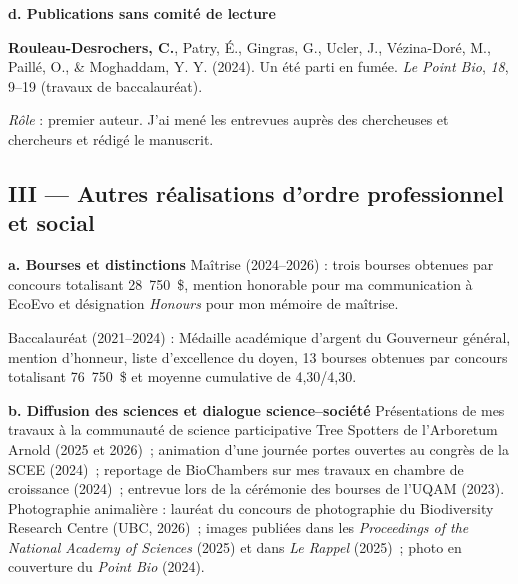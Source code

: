 \documentclass[12pt]{article}
\begin{document}

\textbf{d. Publications sans comité de lecture} 

\textbf{Rouleau-Desrochers, C.}, Patry, É., Gingras, G., Ucler, J., Vézina-Doré, M., Paillé, O., \& Moghaddam, Y. Y. (2024). Un été parti en fumée. \textit{Le Point Bio}, \textit{18}, 9--19 (travaux de baccalauréat). 

\textit{Rôle} : premier auteur. J'ai mené les entrevues auprès des chercheuses et chercheurs et rédigé le manuscrit.

\subsection*{III --- Autres réalisations d'ordre professionnel et social}

\textbf{a. Bourses et distinctions} 
Maîtrise (2024--2026) : trois bourses obtenues par concours totalisant 28~750~\$, mention honorable pour ma communication à EcoEvo et désignation \textit{Honours} pour mon mémoire de maîtrise. 

Baccalauréat (2021--2024) : Médaille académique d'argent du Gouverneur général, mention d'honneur, liste d'excellence du doyen, 13 bourses obtenues par concours totalisant 76~750~\$ et moyenne cumulative de 4,30/4,30. 


\textbf{b. Diffusion des sciences et dialogue science--société} 
Présentations de mes travaux à la communauté de science participative Tree Spotters de l'Arboretum Arnold (2025 et 2026)~; animation d'une journée portes ouvertes au congrès de la SCEE (2024)~; reportage de BioChambers sur mes travaux en chambre de croissance (2024)~; entrevue lors de la cérémonie des bourses de l'UQAM (2023). 
Photographie animalière : lauréat du concours de photographie du Biodiversity Research Centre (UBC, 2026)~; images publiées dans les \textit{Proceedings of the National Academy of Sciences} (2025) et dans \textit{Le Rappel} (2025)~; photo en couverture du \textit{Point Bio} (2024).
\end{document}
